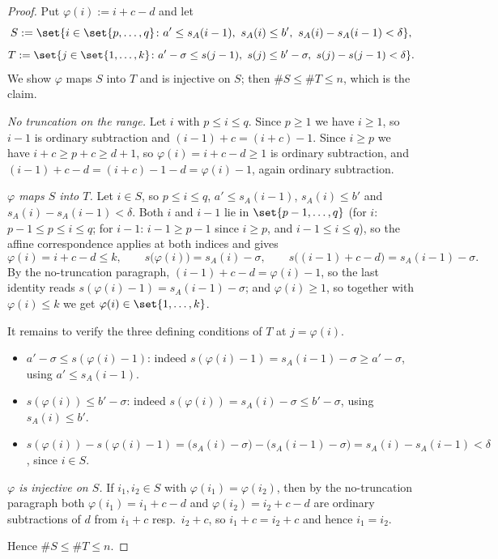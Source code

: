 \begin{proof}
  Put $\varphi(i) := i+c-d$ and let
  \[
    S := \set{ i \in \set{p,\dots,q} \colon a' \le s_A(i-1),\ s_A(i) \le b',\
      s_A(i) - s_A(i-1) < \delta },
  \]
  \[
    T := \set{ j \in \set{1,\dots,k} \colon a'-\sigma \le s(j-1),\ s(j) \le b'-\sigma,\
      s(j)-s(j-1) < \delta }
    .
  \]
  We show $\varphi$ maps $S$ into $T$ and is injective on $S$; then $\#S \le \#T \le n$, which is
  the claim.

  \emph{No truncation on the range.} Let $i$ with $p \le i \le q$. Since $p \ge 1$ we have
  $i \ge 1$, so $i-1$ is ordinary subtraction and $(i-1)+c = (i+c)-1$. Since $i \ge p$ we have
  $i + c \ge p + c \ge d+1$, so $\varphi(i) = i+c-d \ge 1$ is ordinary subtraction, and
  $(i-1)+c-d = (i+c)-1-d = \varphi(i)-1$, again ordinary subtraction.

  \emph{$\varphi$ maps $S$ into $T$.} Let $i \in S$, so $p \le i \le q$, $a' \le s_A(i-1)$,
  $s_A(i) \le b'$ and $s_A(i)-s_A(i-1) < \delta$. Both $i$ and $i-1$ lie in $\set{p-1,\dots,q}$
  (for $i$: $p-1 \le p \le i \le q$; for $i-1$: $i-1 \ge p-1$ since $i \ge p$, and
  $i-1 \le i \le q$), so the affine correspondence applies at both indices and gives
  \[
    \varphi(i) = i+c-d \le k,
    \qquad
    s\bigl(\varphi(i)\bigr) = s_A(i) - \sigma,
    \qquad
    s\bigl((i-1)+c-d\bigr) = s_A(i-1) - \sigma
    .
  \]
  By the no-truncation paragraph, $(i-1)+c-d = \varphi(i)-1$, so the last identity reads
  $s(\varphi(i)-1) = s_A(i-1)-\sigma$; and $\varphi(i) \ge 1$, so together with $\varphi(i) \le k$
  we get $\varphi(i) \in \set{1,\dots,k}$.

  It remains to verify the three defining conditions of $T$ at $j = \varphi(i)$.
  \begin{itemize}
    \item $a'-\sigma \le s(\varphi(i)-1)$: indeed $s(\varphi(i)-1) = s_A(i-1)-\sigma \ge
      a'-\sigma$, using $a' \le s_A(i-1)$.
    \item $s(\varphi(i)) \le b'-\sigma$: indeed $s(\varphi(i)) = s_A(i)-\sigma \le b'-\sigma$,
      using $s_A(i) \le b'$.
    \item $s(\varphi(i)) - s(\varphi(i)-1) = \bigl(s_A(i)-\sigma\bigr) - \bigl(s_A(i-1)-\sigma\bigr)
      = s_A(i) - s_A(i-1) < \delta$, since $i \in S$.
  \end{itemize}

  \emph{$\varphi$ is injective on $S$.} If $i_1, i_2 \in S$ with $\varphi(i_1) = \varphi(i_2)$,
  then by the no-truncation paragraph both $\varphi(i_1) = i_1+c-d$ and $\varphi(i_2) = i_2+c-d$
  are ordinary subtractions of $d$ from $i_1+c$ resp.\ $i_2+c$, so $i_1+c = i_2+c$ and hence
  $i_1 = i_2$.

  Hence $\#S \le \#T \le n$.
\end{proof}
